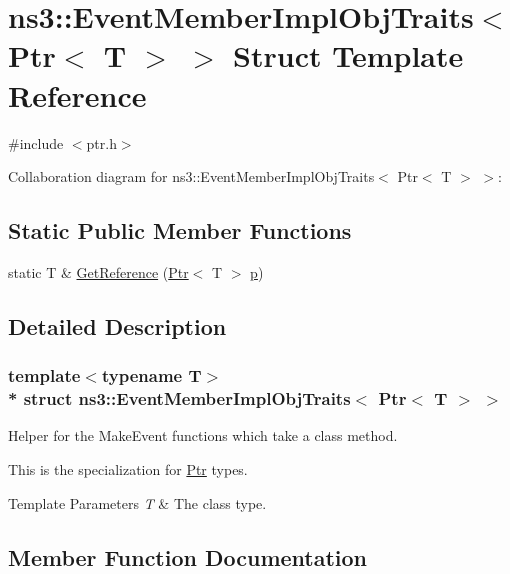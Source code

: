 \hypertarget{structns3_1_1EventMemberImplObjTraits_3_01Ptr_3_01T_01_4_01_4}{}\section{ns3\+:\+:Event\+Member\+Impl\+Obj\+Traits$<$ Ptr$<$ T $>$ $>$ Struct Template Reference}
\label{structns3_1_1EventMemberImplObjTraits_3_01Ptr_3_01T_01_4_01_4}


{\ttfamily \#include $<$ptr.\+h$>$}



Collaboration diagram for ns3\+:\+:Event\+Member\+Impl\+Obj\+Traits$<$ Ptr$<$ T $>$ $>$\+:
\subsection*{Static Public Member Functions}
\begin{DoxyCompactItemize}
\item 
static T \& \hyperlink{structns3_1_1EventMemberImplObjTraits_3_01Ptr_3_01T_01_4_01_4_a2f05d25842498f13547348b59c65488c}{Get\+Reference} (\hyperlink{classns3_1_1Ptr}{Ptr}$<$ T $>$ \hyperlink{lte__link__budget__x2__handover__measures_8m_ac9de518908a968428863f829398a4e62}{p})
\end{DoxyCompactItemize}


\subsection{Detailed Description}
\subsubsection*{template$<$typename T$>$\\*
struct ns3\+::\+Event\+Member\+Impl\+Obj\+Traits$<$ Ptr$<$ T $>$ $>$}

Helper for the Make\+Event functions which take a class method.

This is the specialization for \hyperlink{classns3_1_1Ptr}{Ptr} types.


\begin{DoxyTemplParams}{Template Parameters}
{\em T} & The class type. \\
\hline
\end{DoxyTemplParams}


\subsection{Member Function Documentation}

